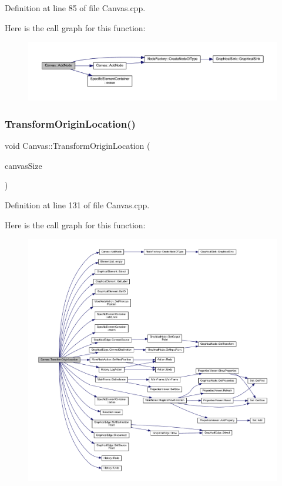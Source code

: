 Definition at line 85 of file Canvas.\+cpp.

Here is the call graph for this function\+:
\nopagebreak
\begin{figure}[H]
\begin{center}
\leavevmode
\includegraphics[width=350pt]{class_canvas_aaec53b68c7b24704e399b565731ed545_cgraph}
\end{center}
\end{figure}
\mbox{\label{class_canvas_a4afa0e24da7b82be3696131c13d89404}} 
\subsubsection{\texorpdfstring{Transform\+Origin\+Location()}{TransformOriginLocation()}}
{\footnotesize\ttfamily void Canvas\+::\+Transform\+Origin\+Location (\begin{DoxyParamCaption}\item[{wx\+Size}]{canvas\+Size }\end{DoxyParamCaption})}



Definition at line 131 of file Canvas.\+cpp.

Here is the call graph for this function\+:
\nopagebreak
\begin{figure}[H]
\begin{center}
\leavevmode
\includegraphics[width=350pt]{class_canvas_a4afa0e24da7b82be3696131c13d89404_cgraph}
\end{center}
\end{figure}


